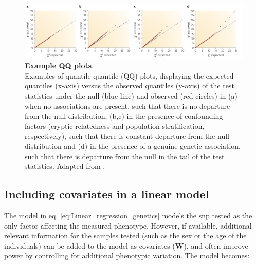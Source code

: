 
\begin{figure}[h]
\centering
\includegraphics[width=15cm]{Chapter2/Fig/qqplots.png}
\caption[QQ plots]{\textbf{Example QQ plots}.\\
Examples of quantile-quantile (QQ) plots, displaying the expected quantiles (x-axis) versus the observed quantiles (y-axis) of the test statistics under the null (blue line) and observed (red circles) in (a) when no associations are present, such that there is no departure from the null distribution,  (b,c) in the presence of confounding factors (cryptic relatedness and population stratification, respectively), such that there is constant departure from the null distribution and (d) in the presence of a genuine genetic association, such that there is departure from the null in the tail of the test statistics.
Adapted from 
\cite{mccarthy2008genome}.
}
\label{fig:qqplots}
\end{figure}



\subsection{Including covariates in a linear model}
\label{sec:confounders}

The model in eq. \eqref{eq:Linear_regression_genetics} models the \gls{snp} tested as the only factor affecting the measured phenotype.
However, if available, additional relevant information for the samples tested (such as the sex or the age of the individuals) can be added to the model as covariates ($\mathbf{W}$), and often improve power by controlling for additional phenotypic variation. 
The model becomes:

